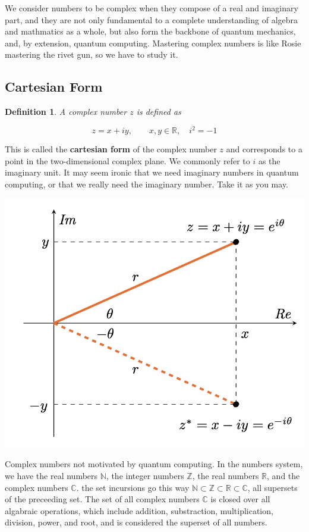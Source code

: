 \documentclass[12pt]{article}
\theoremstyle{plain}
\newtheorem{definition}[theorem]{Definition}
\theoremstyle{definition}
\begin{document}
We consider numbers to be complex when they compose of a real and imaginary part, and they are not only fundamental to a complete understanding of algebra and mathmatics as a whole, but also form the backbone of quantum mechanics, and, by extension, quantum computing. Mastering complex numbers is like Rosie mastering the rivet gun, so we have to study it. 

\subsection{Cartesian Form}


\begin{definition}
    A complex number $z$ is defined as 

    $$
        z = x + iy, \qquad x, y \in \mathbb{R}, \quad i^2 = -1
    $$
\end{definition}

This is called the \textbf{cartesian form} of the complex number $z$ and corresponds to a point in the two-dimensional complex plane. We commonly refer to $i$ as the imaginary unit. It may seem ironic that we need imaginary numbers in quantum computing, or that we really need the imaginary number. Take it as you may. 

\includegraphics[width=\textwidth]{3_cn0.png}

Complex numbers not motivated by quantum computing. In the numbers system, we have the real numbers $\mathbb{N}$, the integer numbers $\mathbb{Z}$, the real numbers $\mathbb{R}$, and the complex numbers $\mathbb{C}$. the set incursions go this way $\mathbb{N} \subset \mathbb{Z} \subset \mathbb{R} \subset \mathbb{C}$, all supersets of the preceeding set. The set of all complex numbers $\mathbb{C}$ is closed over all algabraic operations, which include addition, substraction, multiplication, division, power, and root, and is considered the superset of all numbers. 
\end{document}
